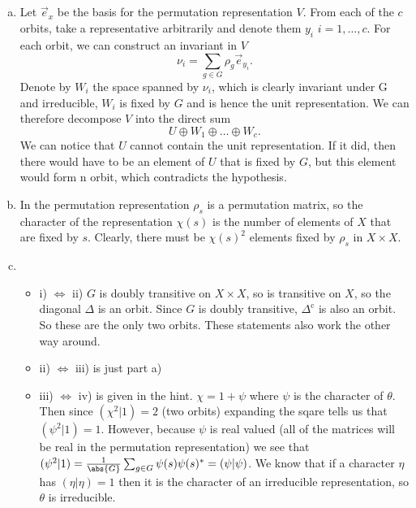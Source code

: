 \documentclass[a4paper, oneside, 10pt]{article}
\numberwithin{Answer}{section}
\numberwithin{Exercise}{section}
\begin{document}
\subsection{}
\begin{enumerate}[a)]
    \item Let $\vec{e}_x$ be the basis for the permutation representation $V$. 
        From each of the $c$ orbits, take a representative arbitrarily and denote them
        $y_i$ $i=1, \dots, c$. For each orbit, we can construct an invariant in $V$
        \[
            \nu_i = \sum_{g\in G} \rho_g \vec{e}_{y_i}.
        \]
        Denote by $W_i$ the space spanned by $\nu_i$, which is clearly invariant under G and irreducible,
        $W_i$ is fixed by $G$ and is hence the unit representation.
        We can therefore decompose $V$ into the direct sum
        \[
            U \oplus W_1 \oplus \dots \oplus W_c.
        \]
        We can notice that $U$ cannot contain the unit representation. If it did, then
        there would have to be an element of $U$ that is fixed by $G$, but this element would 
        form n orbit, which contradicts the hypothesis.
    \item In the permutation representation $\rho_s$ is a permutation matrix, so the character of
        the representation $\chi(s)$ is the number of elements of $X$ that are fixed by $s$. 
        Clearly, there must be $\chi(s)^2$ elements fixed by $\rho_s$ in $X\times X$.
    \item
    \begin{itemize}
        \item i) $\iff$ ii) $G$ is doubly transitive on $X\times X$, so is transitive on $X$, so the diagonal $\Delta$ is an orbit.
            Since $G$ is doubly transitive, $\Delta^\text{c}$ is also an orbit. So these are the only two orbits. 
            These statements also work the other way around. 
        \item ii) $\iff$ iii) is just part a)
        \item iii) $\iff$ iv) is given in the hint. $\chi = 1 + \psi$ where $\psi$ is the character of $\theta$.
            Then since $(\chi^2 | 1) = 2$ (two orbits) expanding the sqare tells us that $(\psi^2|1) = 1$. 
            However, because $\psi$ is real valued (all of the matrices will be real in the permutation representation)
            we see that $(\psi^2|1) = \frac1{\abs{G}} \sum_{g\in G} \psi(s) \psi(s)^* = (\psi|\psi)$. 
            We know that if a character $\eta$ has $(\eta | \eta) = 1$ then it is the character of an irreducible representation,
            so $\theta$ is irreducible.
    \end{itemize}
\end{enumerate}
\end{document}
